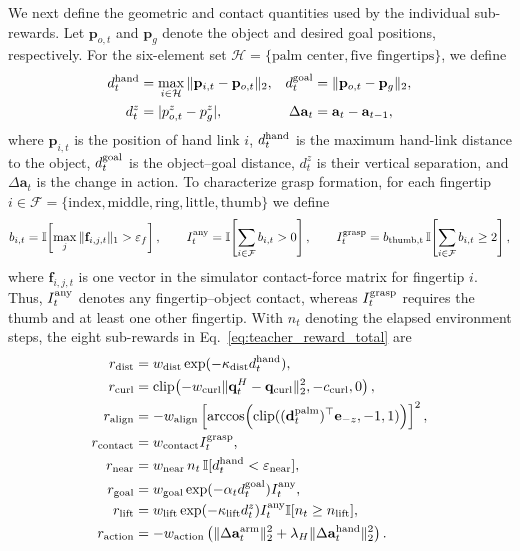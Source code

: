 We next define the geometric and contact quantities used by the individual
sub-rewards.  Let $\mathbf p_{o,t}$ and $\mathbf p_g$ denote the object and
desired goal positions, respectively.  For the six-element set
$\mathcal H=\{\text{palm center},\text{five fingertips}\}$, we define
\begin{align*}
d_t^{\rm hand}
  &=\max_{i\in\mathcal H}\|\mathbf p_{i,t}-\mathbf p_{o,t}\|_2, &
d_t^{\rm goal}
  &=\|\mathbf p_{o,t}-\mathbf p_g\|_2,\\
d_t^{z}
  &=|p_{o,t}^{z}-p_g^{z}|, &
\Delta\mathbf a_t&=\mathbf a_t-\mathbf a_{t-1},
\end{align*}
where $\mathbf p_{i,t}$ is the position of hand link $i$, $d_t^{\rm hand}$ is
the maximum hand-link distance to the object, $d_t^{\rm goal}$ is the object--goal
distance, $d_t^z$ is their vertical separation, and $\Delta\mathbf a_t$ is the
change in action.  To characterize grasp formation, for each fingertip
$i\in\mathcal F=\{\mathrm{index,middle,ring,little,thumb}\}$ we define
\begin{equation}
b_{i,t}=\mathbb I\!\left[
  \max_j\|\mathbf f_{i,j,t}\|_1>\varepsilon_f
\right],\qquad
I_t^{\rm any}=\mathbb I\!\left[\sum_{i\in\mathcal F}b_{i,t}>0\right],
\qquad
I_t^{\rm grasp}=b_{\rm thumb,t}\,
\mathbb I\!\left[\sum_{i\in\mathcal F}b_{i,t}\geq2\right],
\label{eq:teacher_contact_indicators}
\end{equation}
where $\mathbf f_{i,j,t}$ is one vector in the simulator contact-force matrix
for fingertip $i$.  Thus, $I_t^{\rm any}$ denotes any fingertip--object
contact, whereas $I_t^{\rm grasp}$ requires the thumb and at least one other
fingertip.  With $n_t$ denoting the elapsed environment steps, the eight
sub-rewards in Eq.~\eqref{eq:teacher_reward_total} are
\begin{align}
r_{\text{dist}}
  &=w_{\rm dist}\exp(-\kappa_{\rm dist}d_t^{\rm hand}),
  \label{eq:teacher_reward_dist}\\
r_{\text{curl}}
  &=\operatorname{clip}\!\left(
      -w_{\rm curl}\|\mathbf q_t^{H}-\mathbf q_{\rm curl}\|_2^2,
      -c_{\rm curl},0
    \right),
  \label{eq:teacher_reward_curl}\\
r_{\text{align}}
  &=-w_{\rm align}\left[
      \arccos\!\left(
        \operatorname{clip}((\mathbf d_t^{\rm palm})^{\top}\mathbf e_{-z},-1,1)
      \right)
    \right]^2,
  \label{eq:teacher_reward_align}\\
r_{\text{contact}}
  &=w_{\rm contact} I_t^{\rm grasp},
  \label{eq:teacher_reward_contact}\\
r_{\text{near}}
  &=w_{\rm near}\,n_t\,\mathbb I[d_t^{\rm hand}<\varepsilon_{\rm near}],
  \label{eq:teacher_reward_near}\\
r_{\text{goal}}
  &=w_{\rm goal}\exp(-\alpha_t d_t^{\rm goal})I_t^{\rm any},
  \label{eq:teacher_reward_goal}\\
r_{\text{lift}}
  &=w_{\rm lift}\exp(-\kappa_{\rm lift}d_t^{z})
    I_t^{\rm any}\mathbb I[n_t\geq n_{\rm lift}],
  \label{eq:teacher_reward_lift}\\
r_{\text{action}}
  &=-w_{\rm action}\left(
      \|\Delta\mathbf a_t^{\rm arm}\|_2^2
      +\lambda_H\|\Delta\mathbf a_t^{\rm hand}\|_2^2
    \right).
  \label{eq:teacher_reward_action}
\end{align}
